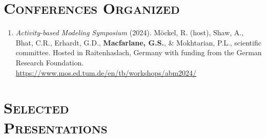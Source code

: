 \documentclass[margin,line]{res}
\newif\ifdetail
\newcounter{enuminitialize}
\newenvironment{myenum}[1][]
{%
 \setcounter{enuminitialize}{#1}
 \addtocounter{enuminitialize}{2}
 \begin{enumerate}[left= 4pt, itemsep=8pt, start=\value{enuminitialize}, label=\arabic*\addtocounter{enumi}{-2}]
}
{%
 \end{enumerate}
}
\newcommand{\secfont}{\scshape }
\begin{document}
\begin{resume}
\section{\secfont Conferences Organized}
\ifdetail
This includes conferences and symposia for which I served on an organizing or
scientific committee.
\fi
\vspace{0.3cm}

\begin{myenum}[1]
  \ifdetail {\color{NavyBlue} \fi
  \item{\textit{Activity-based Modeling Symposium} (2024). M\"ockel, R. (host),  Shaw, A., Bhat, C.R., Erhardt, G.D.,  \textbf{Macfarlane, G.S.}, \& Mokhtarian, P.L., scientific committee.   Hosted in Raitenhaslach, Germany with funding from the German Research Foundation. \url{https://www.mos.ed.tum.de/en/tb/workshops/abm2024/}}
  \ifdetail } \fi
\end{myenum}  

\section{\secfont Selected \\Presentations}
\ifdetail This includes invited presentations to academic and non-academic audiences, as
well as presentations resulting from abstract-only submission. Includes both
lectern sessions and posters. Item 1 came from my undergraduate honors thesis, items 2 through 4 from doctoral research,
items 5 through 10 from my work as a consultant, and items 11 through the present represent work
completed during my time at BYU.\fi

\vspace{0.3cm}




\end{resume}
\end{document}
